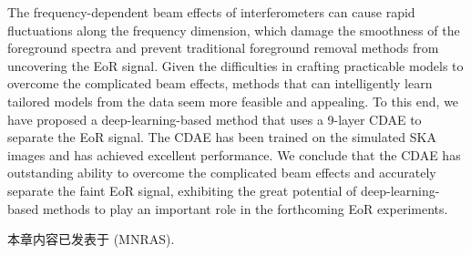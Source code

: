 The frequency-dependent beam effects of interferometers can cause
rapid fluctuations along the frequency dimension,
which damage the smoothness of the foreground spectra and prevent
traditional foreground removal methods from uncovering the EoR signal.
Given the difficulties in crafting practicable models to overcome the
complicated beam effects, methods that can intelligently learn tailored
models from the data seem more feasible and appealing.
To this end, we have proposed a deep-learning-based method that uses
a 9-layer CDAE to separate the EoR signal.
The CDAE has been trained on the simulated SKA images and has achieved
excellent performance.
We conclude that the CDAE has outstanding ability to overcome the
complicated beam effects and accurately separate the faint EoR signal,
exhibiting the great potential of deep-learning-based methods
to play an important role in the forthcoming EoR experiments.

本章内容已发表于 \mnras{} (MNRAS).


